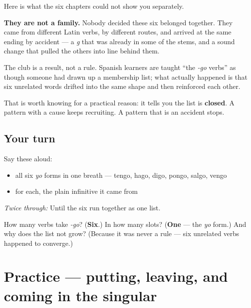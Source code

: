 \begin{cousinweb}
Here is what the six chapters could not show you separately.

\textbf{They are not a family.} Nobody decided these six belonged together. They came from different Latin verbs, by different routes, and arrived at the same ending by accident — a \emph{g} that was already in some of the stems, and a sound change that pulled the others into line behind them.

The club is a result, not a rule. Spanish learners are taught \textquotedblleft{}the \emph{-go} verbs\textquotedblright{} as though someone had drawn up a membership list; what actually happened is that six unrelated words drifted into the same shape and then reinforced each other.

That is worth knowing for a practical reason: it tells you the list is \textbf{closed}. A pattern with a cause keeps recruiting. A pattern that is an accident stops.
\end{cousinweb}

\subsection*{Your turn}
Say these aloud:

\begin{itemize}
\raggedright
  \item all six \emph{yo} forms in one breath — tengo, hago, digo, pongo, salgo, vengo
  \item for each, the plain infinitive it came from
\end{itemize}

\emph{Twice through:} Until the six run together as one list.

\begin{tcolorbox}[breakable,colback=teal!4,colframe=teal!35!black,title={Before you move on}]
How many verbs take \emph{-go}? (\textbf{Six}.) In how many slots? (\textbf{One} — the \emph{yo} form.) And why does the list not grow? (Because it was never a rule — six unrelated verbs happened to converge.)
\end{tcolorbox}
\section[Practice]{Practice — putting, leaving, and coming in the singular}

\label{lesson:ES-C13-practice}



